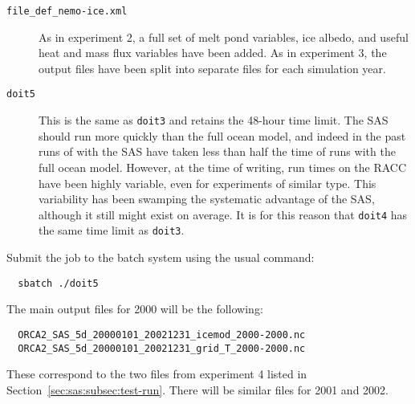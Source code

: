 \begin{description}
    \item[\texttt{file\_def\_nemo-ice.xml}]
        As in experiment 2, a full set of melt pond variables, ice albedo, and useful heat and mass flux variables have been added.
        As in experiment 3, the output files have been split into separate files for each simulation year.

    \item[\texttt{doit5}]
        This is the same as \verb|doit3| and retains the 48-hour time limit.
        The SAS should run more quickly than the full ocean model, and indeed in the past runs of \SIcu{} with the SAS have taken less than half the time of runs with the full ocean model.
        However, at the time of writing, run times on the RACC have been highly variable, even for experiments of similar type.
        This variability has been swamping the systematic advantage of the SAS, although it still might exist on average.
        It is for this reason that \verb|doit4| has the same time limit as \verb|doit3|.

\end{description}

Submit the job to the batch system using the usual command:

\begin{verbatim}
  sbatch ./doit5
\end{verbatim}

\noindent{}The main output files for 2000 will be the following:

\begin{verbatim}
  ORCA2_SAS_5d_20000101_20021231_icemod_2000-2000.nc
  ORCA2_SAS_5d_20000101_20021231_grid_T_2000-2000.nc
\end{verbatim}

\noindent{}These correspond to the two files from experiment 4 listed in Section~\ref{sec:sas:subsec:test-run}.
There will be similar files for 2001 and 2002.
